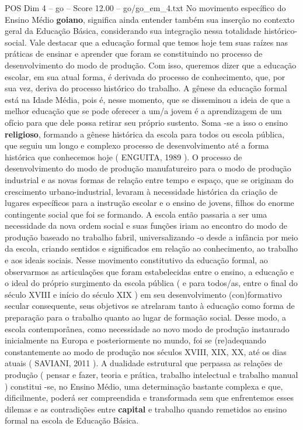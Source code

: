 \begin{textsample}{POS Dim 4 – go – Score 12.00 – go/go\_em\_4.txt}
No movimento específico do Ensino Médio \textbf{goiano}, significa ainda entender também sua inserção no contexto geral da Educação Básica, considerando sua integração nessa totalidade histórico-social.
Vale destacar que a educação formal que temos hoje tem suas raízes nas práticas de ensinar e aprender que foram se constituindo no processo de desenvolvimento do modo de produção.
Com isso, queremos dizer que a educação escolar, em sua atual forma, é derivada do processo de conhecimento, que, por sua vez, deriva do processo histórico do trabalho.
A gênese da educação formal está na Idade Média, pois é, nesse momento, que se disseminou a ideia de que a melhor educação que se pode oferecer a um/a jovem é a aprendizagem de um ofício para que dele possa retirar seu próprio sustento.
Soma -se a isso o ensino \textbf{religioso}, formando a gênese histórica da escola para todos ou escola pública, que seguiu um longo e complexo processo de desenvolvimento até a forma histórica que conhecemos hoje ( ENGUITA, 1989 ).
O processo de desenvolvimento do modo de produção manufatureiro para o modo de produção industrial e as novas formas de relação entre tempo e espaço, que se originam do crescimento urbano-industrial, levaram à necessidade histórica da criação de lugares específicos para a instrução escolar e o ensino de jovens, filhos do enorme contingente social que foi se formando.
A escola então passaria a ser uma necessidade da nova ordem social e suas funções iriam ao encontro do modo de produção baseado no trabalho fabril, universalizando -o desde a infância por meio da escola, criando sentidos e significados em relação ao conhecimento, ao trabalho e aos ideais sociais.
Nesse movimento constitutivo da educação formal, ao observarmos as articulações que foram estabelecidas entre o ensino, a educação e o ideal do próprio surgimento da escola pública ( e para todos/as, entre o final do século XVIII e início do século XIX ) em seu desenvolvimento (con)formativo secular consequente, seus objetivos se atrelaram tanto à educação como forma de preparação para o trabalho quanto ao lugar de formação social.
Desse modo, a escola contemporânea, como necessidade ao novo modo de produção instaurado inicialmente na Europa e posteriormente no mundo, foi se (re)adequando constantemente ao modo de produção nos séculos XVIII, XIX, XX, até os dias atuais ( SAVIANI, 2011 ).
A dualidade estrutural que perpassa as relações de produção ( pensar e fazer, teoria e prática, trabalho intelectual e trabalho manual ) constitui -se, no Ensino Médio, uma determinação bastante complexa e que, dificilmente, poderá ser compreendida e transformada sem que enfrentemos esses dilemas e as contradições entre \textbf{capital} e trabalho quando remetidos ao ensino formal na escola de Educação Básica.

\end{textsample}
